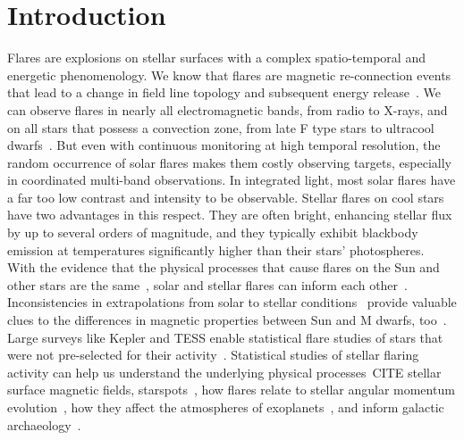 \documentclass{aa}
\begin{document}
\section{Introduction}
Flares are explosions on stellar surfaces with a complex spatio-temporal and energetic phenomenology. We know that flares are magnetic re-connection events that lead to a change in field line topology and subsequent energy release~\citep{priest_magnetic_2002}. We can observe flares in nearly all electromagnetic bands, from radio %
to X-rays, and on all stars that possess a convection zone, from late F type stars to ultracool dwarfs~\citep{gizis_kepler_2013}. But even with continuous monitoring at high temporal resolution, the random occurrence of solar flares makes them costly observing targets, especially in coordinated multi-band observations. In integrated light, most solar flares have a far too low contrast and intensity to be observable. Stellar flares on cool stars have two advantages in this respect. They are often bright, enhancing stellar flux by up to several orders of magnitude, and they typically exhibit blackbody emission at temperatures significantly higher than their stars' photospheres.
\\
With the evidence that the physical processes that cause flares on the Sun and other stars are the same~\citep{karoff_observational_2016}, solar and stellar flares can inform each other~\citep{shibayama_2013}. Inconsistencies in extrapolations from solar to stellar conditions~\citep{Aarnio2011, aarnio_masslosscme_2012, drake_cmemassloss_2013} provide valuable clues to the differences in magnetic properties between Sun and M dwarfs, too~\citep{alvaradogomez_cme_2018}. Large surveys like Kepler and TESS enable statistical flare studies of stars that were not pre-selected for their activity~\citep{walkowicz_white-light_2011}. Statistical studies of stellar flaring activity can help us understand the underlying physical processes~CITE stellar surface magnetic fields, starspots~\citep{davenport_flaresandspots_2015, howard_evryflare2arxiv_2019}, how flares relate to stellar angular momentum evolution~\citep{mondrik_flarerotation_2019, howard_evryflare2arxiv_2019}, how they affect the atmospheres of exoplanets~\citep{lecavelier_flareescape_2012, loyd_mflaresplanetsfuv_2018, tilley_repeated_flare_2019, howard2019}, and inform galactic archaeology~\citep{howard2019}. %
\end{document}
